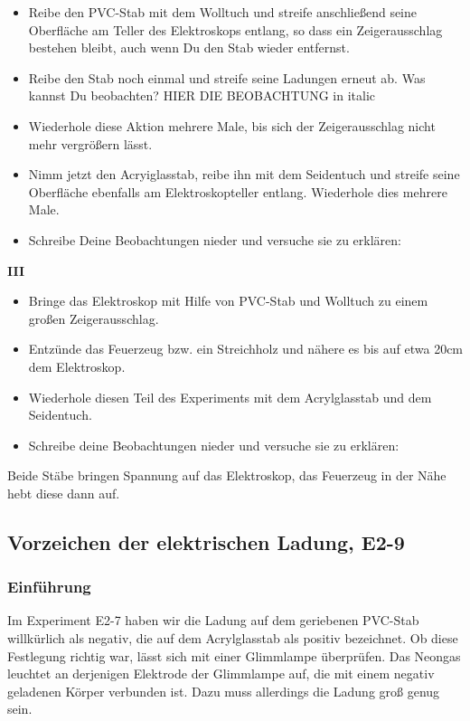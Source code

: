 \documentclass[a4paper]{report}
\begin{document}
\begin{itemize} \item Reibe den PVC-Stab mit dem Wolltuch und streife
  anschließend seine Oberfläche am Teller des Elektroskops entlang, so dass ein
  Zeigerausschlag bestehen bleibt, auch wenn Du den Stab wieder entfernst.
  \item Reibe den Stab noch einmal und streife seine Ladungen erneut ab. Was
    kannst Du beobachten? HIER DIE BEOBACHTUNG in italic \item Wiederhole diese
    Aktion mehrere Male, bis sich der Zeigerausschlag nicht mehr vergrößern
    lässt. \item Nimm jetzt den Acryiglasstab, reibe ihn mit dem Seidentuch und
    streife seine Oberfläche ebenfalls am Elektroskopteller entlang. Wiederhole
    dies mehrere Male. \item Schreibe Deine Beobachtungen nieder und versuche
    sie zu erklären: \end{itemize}

    \textbf{III}\\ \begin{itemize} \item Bringe das Elektroskop mit Hilfe von
      PVC-Stab und Wolltuch zu einem großen Zeigerausschlag. \item Entzünde das
      Feuerzeug bzw. ein Streichholz und nähere es bis auf etwa 20cm dem
      Elektroskop. \item Wiederhole diesen Teil des Experiments mit dem
      Acrylglasstab und dem Seidentuch. \item Schreibe deine Beobachtungen
  nieder und versuche sie zu erklären: \end{itemize}
Beide Stäbe bringen Spannung auf das Elektroskop, das Feuerzeug in der Nähe
hebt diese dann auf.


\subsection{Vorzeichen der elektrischen Ladung, E2-9}

\subsubsection{Einführung} Im Experiment E2-7 haben wir die Ladung auf dem
geriebenen PVC-Stab willkürlich als negativ, die auf dem Acrylglasstab als
positiv bezeichnet. Ob diese Festlegung richtig war, lässt sich mit einer
Glimmlampe überprüfen. Das Neongas leuchtet an derjenigen Elektrode der
Glimmlampe auf, die mit einem negativ geladenen Körper verbunden ist. Dazu muss
allerdings die Ladung groß genug sein.
\end{document}
